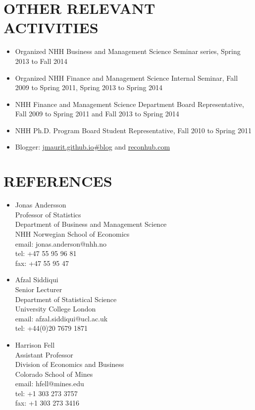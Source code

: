 \documentclass[margin]{res}
\begin{document}
\begin{resume}
\section{OTHER RELEVANT ACTIVITIES}
\begin{itemize}
\setlength{\itemsep}{10pt}
\item[] Organized NHH Business and Management Science Seminar series, Spring 2013 to Fall 2014
\item[] Organized NHH Finance and Management Science Internal Seminar, Fall 2009 to Spring 2011, Spring 2013 to Spring 2014
\item[] NHH Finance and Management Science Department Board Representative, Fall 2009 to Spring 2011 and Fall 2013 to Spring 2014
\item[] NHH Ph.D. Program Board Student Representative, Fall 2010 to Spring 2011
\item[] Blogger: \url{jmaurit.github.io#blog} and \url{reconhub.com}
\end{itemize}
 
\section{REFERENCES}
\begin{itemize}
\setlength{\itemsep}{10pt}
\item[] Jonas Andersson \\
Professor of Statistics \\
Department of Business and Management Science\\
NHH Norwegian School of Economics \\
email: jonas.anderson@nhh.no\\
tel: +47 55 95 96 81\\
fax: +47 55 95 47\\

\item[] Afzal Siddiqui \\
Senior Lecturer \\
Department of Statistical Science\\
University College London \\
email: afzal.siddiqui@ucl.ac.uk\\
tel: +44(0)20 7679 1871\\

\item[] Harrison Fell \\
Assistant Professor \\
Division of Economics and Business \\
Colorado School of Mines\\
email: hfell@mines.edu\\
tel: +1 303 273 3757\\
fax: +1 303 273 3416\\

\end{itemize}

\end{resume} 
\end{document}
